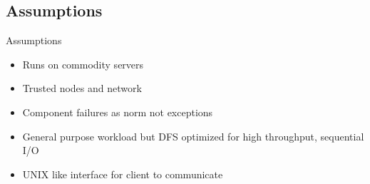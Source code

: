 \documentclass{beamer}
\begin{document}
\subsection{Assumptions}
\begin{frame}{Assumptions}
\begin{itemize}
\item Runs on commodity servers
\item Trusted nodes and network
\item Component failures as norm not exceptions
\item General purpose workload but DFS optimized for high throughput, sequential I/O
\item UNIX like interface for client to communicate
\end{itemize}
\end{frame}
\end{document}
